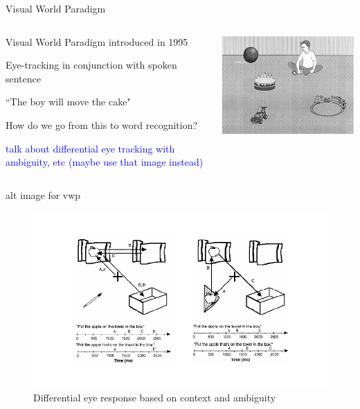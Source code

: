 \documentclass{beamer}
\newcommand{\vp}{\vspace{2mm}}
\providecommand{\cn}[1]{\textcolor{blue}{#1}}
\begin{document}
\begin{frame}{Visual World Paradigm}
\begin{columns}
\begin{column}{0.45\textwidth}

Visual World Paradigm introduced in 1995 \vp

Eye-tracking in conjunction with spoken sentence \vp

``The boy will move the cake" \vp

How do we go from this to word recognition? \vp

\cn{talk about differential eye tracking with ambiguity, etc (maybe use that image instead)}

\end{column}
\begin{column}{0.5\textwidth}  %
\begin{center}
\includegraphics[scale=.9]{img/vwp_classic.png}
\end{center}
\end{column}
\end{columns}
\end{frame}

\begin{frame}{alt image for vwp}
\begin{figure}
\centering
\includegraphics[width=\textwidth]{apple_combine.pdf}
\caption{Differential eye response based on context and ambiguity}
\end{figure}
\end{frame}
\end{document}
